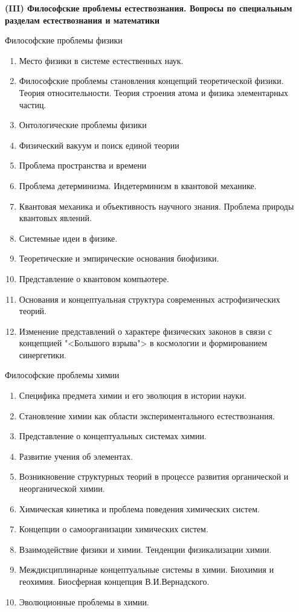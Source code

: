 \documentclass[main.tex]{subfiles}
\begin{document}
\vspace{12mm}
{\parindent0pt\textbf{(III) Философские проблемы естествознания. Вопросы по специальным разделам естествознания и математики}}

\vspace{4mm}
\centerline{Философские проблемы физики}
\begin{enumerate}[nosep,leftmargin=*]
	\item Место физики в системе естественных наук.
	\item Философские проблемы становления концепций теоретической физики. Теория относительности. Теория строения атома и физика элементарных частиц.
	\item Онтологические проблемы физики
	\item Физический вакуум и поиск единой теории
	\item Проблема пространства и времени
	\item Проблема детерминизма. Индетерминизм в квантовой механике.
	\item Квантовая механика и объективность научного знания. Проблема природы квантовых явлений.
	\item Системные идеи в физике.
	\item Теоретические и эмпирические основания биофизики.
	\item Представление о квантовом компьютере.
	\item Основания и концептуальная структура современных астрофизических теорий.
	\item Изменение представлений о характере физических законов в связи с концепцией "<Большого взрыва"> в космологии и формированием синергетики.
\end{enumerate}

\vspace{4mm}
\centerline{Философские проблемы химии}
\begin{enumerate}[nosep,leftmargin=*]
	\item Специфика предмета химии и его эволюция в истории науки.
	\item Становление химии как области экспериментального естествознания.
	\item Представление о концептуальных системах химии.
	\item Развитие учения об элементах.
	\item Возникновение структурных теорий в процессе развития органической и неорганической химии.
	\item Химическая кинетика и проблема поведения химических систем.
	\item Концепции о самоорганизации химических систем.
	\item Взаимодействие физики и химии. Тенденции физикализации химии.
	\item Междисциплинарные концептуальные системы в химии. Биохимия и геохимия. Биосферная концепция В.И.Вернадского.
	\item Эволюционные проблемы в химии.
\end{enumerate}
\end{document}
